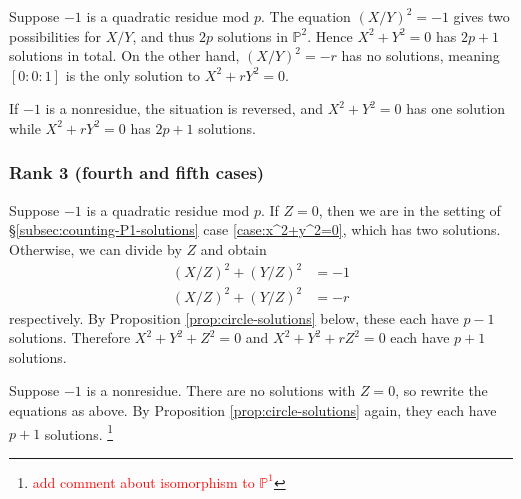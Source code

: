 \documentclass[10pt,a4paper]{amsart}
\numberwithin{equation}{section}
\numberwithin{figure}{section}
\theoremstyle{definition}
\theoremstyle{remark}
\theoremstyle{plain}
\theoremstyle{plain}
\theoremstyle{definition}
\theoremstyle{plain}
\theoremstyle{plain}
\renewcommand{\P}{\mathbb{P}}
\begin{document}
	Suppose $-1$ is a quadratic residue mod $p$. The equation $(X/Y)^2 = -1$ gives
	two possibilities for $X/Y$, and thus $2p$ solutions in $\mathbb{P}^2$. Hence
	$X^2 + Y^2 = 0$ has $2p + 1$ solutions in total. On the other hand, $(X/Y)^2 =
	-r$ has no solutions, meaning $[0:0:1]$ is the only solution to $X^2 + rY^2 =
	0$.
	
	If $-1$ is a nonresidue, the situation is reversed, and $X^2 + Y^2 = 0$ has one
	solution while $X^2 + rY^2 = 0$ has $2p + 1$ solutions.
	
	\subsubsection*{Rank 3 (fourth and fifth cases)} 
	Suppose $-1$ is a quadratic residue mod $p$. If $Z = 0$, then we are in the setting of
	\S\ref{subsec:counting-P1-solutions} case \eqref{case:x^2+y^2=0}, which has two
	solutions. Otherwise, we can divide by $Z$ and obtain 
	\begin{align*} 
	(X/Z)^2 + (Y/Z)^2 &= -1 \\ 
	(X/Z)^2 + (Y/Z)^2 &= -r 
	\end{align*} 
	respectively. By Proposition \ref{prop:circle-solutions} below, these each have $p - 1$
	solutions. Therefore $X^2 + Y^2 + Z^2 = 0$ and $X^2 + Y^2 + rZ^2 = 0$ each have
	$p+1$ solutions.
	
	Suppose $-1$ is a nonresidue. There are no solutions with $Z=0$, so rewrite the
	equations as above. By Proposition \ref{prop:circle-solutions} again, they each
	have $p + 1$ solutions. \footnote{\textcolor{red}{add comment about isomorphism
			to $\P^1$}}
	
\end{document}
